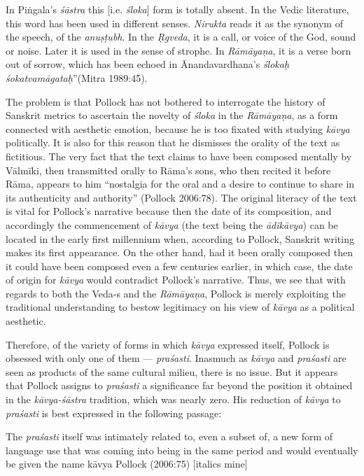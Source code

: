 \begin{myquote}
In Piṅgala's {\sl śāstra} this [i.e. {\sl śloka}] form is totally absent. In the Vedic literature, this word has been used in different senses. {\sl Nirukta} reads it as the synonym of the speech, of the {\sl anuṣṭubh}. In the {\sl Ṛgveda}, it is a call, or voice of the God, sound or noise. Later it is used in the sense of strophe. In {\sl Rāmāyaṇa}, it is a verse born out of sorrow, which has been echoed in Ānandavardhana's {\sl ślokaḥ śokatvamāgataḥ}''\hfill (Mitra 1989:45).
\end{myquote}

The problem is that Pollock has not bothered to interrogate the history of Sanskrit metrics to ascertain the novelty of {\sl śloka} in the {\sl Rāmāyaṇa}, as a form connected with aesthetic emotion, because he is too fixated with studying {\sl kāvya} politically. It is also for this reason that he dismisses the orality of the text as fictitious. The very fact that the text claims to have been composed mentally by Vālmīki, then transmitted orally to Rāma's sons, who then recited it before Rāma, appears to him ``nostalgia for the oral and a desire to continue to share in its authenticity and authority'' (Pollock 2006:78). The original literacy of the text is vital for Pollock's narrative because then the date of its composition, and accordingly the commencement of {\sl kāvya} (the text being the {\sl ādikāvya}) can be located in the early first millennium when, according to Pollock, Sanskrit writing makes its first appearance. On the other hand, had it been orally composed then it could have been composed even a few centuries earlier, in which case, the date of origin for {\sl kāvya} would contradict Pollock's narrative. Thus, we see that with regards to both the Veda-s and the {\sl Rāmāyaṇa}, Pollock is merely exploiting the traditional understanding to bestow legitimacy on his view of {\sl kāvya} as a political aesthetic.

Therefore, of the variety of forms in which {\sl kāvya} expressed itself, Pollock is obsessed with only one of them --- {\sl praśasti}. Inasmuch as {\sl kāvya} and {\sl praśasti} are seen as products of the same cultural milieu, there is no issue. But it appears that Pollock assigns to {\sl praśasti} a significance far beyond the position it obtained in the {\sl kāvya-śāstra} tradition, which was nearly zero. His reduction of {\sl kāvya} to {\sl praśasti} is best expressed in the following passage:

\begin{myquote}
The {\sl praśasti} itself was intimately related to, even a subset of, a new form of language use that was coming into being in the same period and would eventually be given the name kāvya 
\hfill Pollock (2006:75) [italics mine]
\end{myquote}

